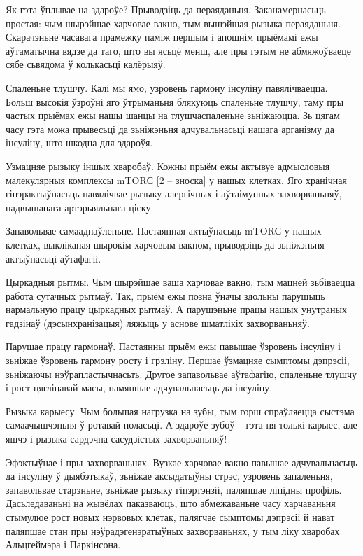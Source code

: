 Як гэта ўплывае на здароўе?
Прыводзіць да пераяданьня. 
Заканамернасьць простая: чым шырэйшае харчовае вакно, тым вышэйшая рызыка пераяданьня. Скарачэньне часавага прамежку паміж першым і апошнім прыёмамі ежы аўтаматычна вядзе да таго, што вы ясьцё менш, але пры гэтым не абмяжоўваеце сябе сьвядома ў колькасьці калёрыяў.

Спаленьне тлушчу. 
Калі мы ямо, узровень гармону інсуліну павялічваецца. Больш высокія ўзроўні яго ўтрыманьня блякуюць спаленьне тлушчу, таму пры частых прыёмах ежы нашы шанцы на тлушчаспаленьне зьніжаюцца. Зь цягам часу гэта можа прывесьці да зьніжэньня адчувальнасьці нашага арганізму да інсуліну, што шкодна для здароўя.

Узмацняе рызыку іншых хваробаў. 
Кожны прыём ежы актывуе адмысловыя малекулярныя комплексы mTORС [2 -- зноска] у нашых клетках. Яго хранічная гіпэрактыўнасьць павялічвае рызыку алергічных і аўтаімунных захворваньняў, падвышанага артэрыяльнага ціску.

Запавольвае самааднаўленьне. 
Пастаянная актыўнасьць mTORС у нашых клетках, выкліканая шырокім харчовым вакном, прыводзіць да зьніжэньня актыўнасьці аўтафагіі.

Цыркадныя рытмы. 
Чым шырэйшае ваша харчовае вакно, тым мацней зьбіваецца работа сутачных рытмаў. Так, прыём ежы позна ўначы здольны парушыць нармальную працу цыркадных рытмаў. А парушэньне працы нашых унутраных гадзінаў (дэсынхранізацыя) ляжыць у аснове шматлікіх захворваньняў.

Парушае працу гармонаў. 
Пастаянны прыём ежы павышае ўзровень інсуліну і зьніжае ўзровень гармону росту і грэліну. Першае ўзмацняе сымптомы дэпрэсіі, зьніжаючы нэўрапластычнасьть. Другое запавольвае аўтафагію, спаленьне тлушчу і рост цягліцавай масы, памяншае адчувальнасьць да інсуліну.

Рызыка карыесу. 
Чым большая нагрузка на зубы, тым горш спраўляецца сыстэма самаачышчэньня ў ротавай поласьці. А здароўе зубоў – гэта ня толькі карыес, але яшчэ і рызыка сардэчна-сасудзістых захворваньняў!

Эфэктыўнае і пры захворваньнях. 
Вузкае харчовае вакно павышае адчувальнасьць да інсуліну ў дыябэтыкаў, зьніжае аксыдатыўны стрэс, узровень запаленьня, запавольвае старэньне, зьніжае рызыку гіпэртэнзіі, паляпшае ліпідны профіль. Дасьледаваньні на жывёлах паказваюць, што абмежаваньне часу харчаваньня стымулюе рост новых нэрвовых клетак, палягчае сымптомы дэпрэсіі й нават паляпшае стан пры нэўрадэгенэратыўных захворваньнях, у тым ліку хваробах Альцгеймэра і Паркінсона.

